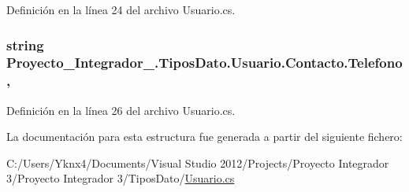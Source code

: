 Definición en la línea 24 del archivo Usuario.\-cs.

\hypertarget{struct_proyecto___integrador__3_1_1_tipos_dato_1_1_usuario_1_1_contacto_ab7f1bc9965c69b9f9c44f5f021fdaec9}{
\subsubsection[{Telefono}]{\setlength{\rightskip}{0pt plus 5cm}string Proyecto\-\_\-\-Integrador\-\_.\-Tipos\-Dato.\-Usuario.\-Contacto.\-Telefono\hspace{0.3cm}{\ttfamily [get]}, {\ttfamily [set]}}}\label{struct_proyecto___integrador__3_1_1_tipos_dato_1_1_usuario_1_1_contacto_ab7f1bc9965c69b9f9c44f5f021fdaec9}


Definición en la línea 26 del archivo Usuario.\-cs.



La documentación para esta estructura fue generada a partir del siguiente fichero\-:\begin{DoxyCompactItemize}
\item 
C\-:/\-Users/\-Yknx4/\-Documents/\-Visual Studio 2012/\-Projects/\-Proyecto Integrador 3/\-Proyecto Integrador 3/\-Tipos\-Dato/\hyperlink{_usuario_8cs}{Usuario.\-cs}\end{DoxyCompactItemize}
